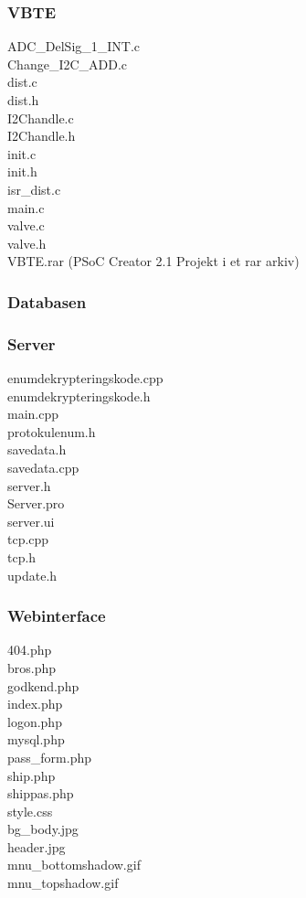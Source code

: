\subsubsection{VBTE}
ADC\_DelSig\_1\_INT.c\\
Change\_I2C\_ADD.c\\
dist.c\\
dist.h\\
I2Chandle.c\\
I2Chandle.h\\
init.c\\
init.h\\
isr\_dist.c\\
main.c\\
valve.c\\
valve.h\\
VBTE.rar (PSoC Creator 2.1 Projekt i et rar arkiv)\\
\subsubsection{Databasen}
\subsubsection*{Server}
enumdekrypteringskode.cpp\\
enumdekrypteringskode.h\\
main.cpp\\
protokulenum.h\\
savedata.h\\
savedata.cpp\\
server.h\\
Server.pro\\
server.ui\\
tcp.cpp\\
tcp.h\\
update.h\\
\subsubsection*{Webinterface}
404.php\\
bros.php\\
godkend.php\\
index.php\\
logon.php\\
mysql.php\\
pass\_form.php\\
ship.php\\
shippas.php\\
style.css\\
bg\_body.jpg\\
header.jpg\\
mnu\_bottomshadow.gif\\
mnu\_topshadow.gif\\


